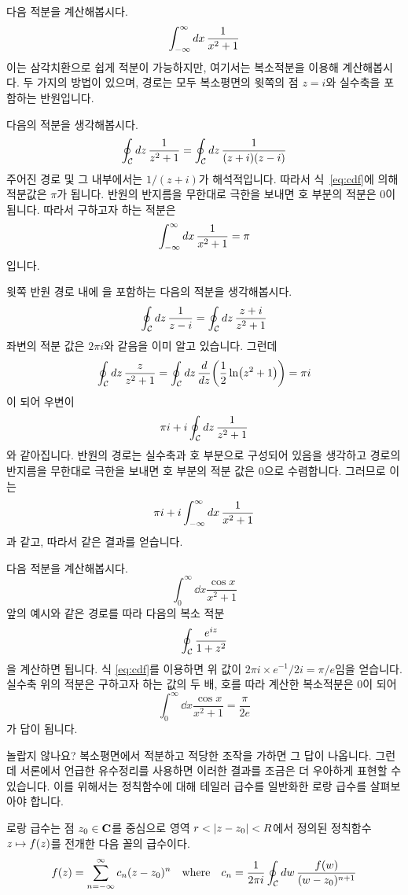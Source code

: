 \documentclass[11pt]{book}
\begin{document}
\begin{MLPar}
\example
다음 적분을 계산해봅시다.
\[\int_{-\infty}^{\infty}\dd{x}\frac{1}{x^2+1}\]
이는 삼각치환으로 쉽게 적분이 가능하지만, 여기서는 복소적분을 이용해 계산해봅시다.
두 가지의 방법이 있으며, 경로는 모두 복소평면의 윗쪽의 점 \(z=i\)와 실수축을 포함하는 반원입니다.

다음의 적분을 생각해봅시다.
\[\oint_{\mathcal{C}}\dd{z}\frac{1}{z^2+1}=\oint_{\mathcal{C}}\dd{z}\frac{1}{(z+i)(z-i)}\]
주어진 경로 및 그 내부에서는 \(1/(z+i)\)가 해석적입니다.
따라서 식~\ref{eq:cdf}에 의해 적분값은 \(\pi\)가 됩니다.
반원의 반지름을 무한대로 극한을 보내면 호 부분의 적분은 0이 됩니다.
따라서 구하고자 하는 적분은
\[\int_{-\infty}^{\infty}\dd{x}\frac{1}{x^2+1}=\pi\]
입니다.

윗쪽 반원 경로 내에 을 포함하는 다음의 적분을 생각해봅시다.
\[\oint_{\mathcal{C}}\dd{z}\frac{1}{z-i} = \oint_{\mathcal{C}}\dd{z}\frac{z+i}{z^2+1}\]
좌변의 적분 값은 \(2\pi i\)와 같음을 이미 알고 있습니다.
그런데
\[\cint\dd{z}\frac{z}{z^2+1} = \cint\dd{z}\dv{z}\pqty{\frac{1}{2}\ln(z^2+1)}=\pi i\]
이 되어 우변이 
\[\pi i + i\oint_{\mathcal{C}}\dd{z}\frac{1}{z^2+1}\]
와 같아집니다.%
반원의 경로는 실수축과 호 부분으로 구성되어 있음을 생각하고 경로의 반지름을 무한대로 극한을 보내면 호 부분의 적분 값은 \(0\)으로 수렴합니다.
그러므로 이는
\[\pi i + i\int_{-\infty}^{\infty}\dd{x}\frac{1}{x^2+1}\]
과 같고, 따라서 같은 결과를 얻습니다.

\example
다음 적분을 계산해봅시다.
\[\int_0^{\infty}\dd{x}\frac{\cos x}{x^2+1}\]
앞의 예시와 같은 경로를 따라 다음의 복소 적분
\[\oint_{\mathcal{C}}\frac{e^{iz}}{1+z^2}\]
을 계산하면 됩니다.
식 \ref{eq:cdf}를 이용하면 위 값이 \(2\pi i \times e^{-1}/2i = \pi/e\)임을 얻습니다.
실수축 위의 적분은 구하고자 하는 값의 두 배, 호를 따라 계산한 복소적분은 0이 되어
\[\int_0^{\infty}\dd{x}\frac{\cos x}{x^2+1} = \frac{\pi}{2e}\]
가 답이 됩니다.

놀랍지 않나요?
복소평면에서 적분하고 적당한 조작을 가하면 그 답이 나옵니다.
그런데 서론에서 언급한 유수정리를 사용하면 이러한 결과를 조금은 더 우아하게 표현할 수 있습니다.
이를 위해서는 정칙함수에 대해 테일러 급수를 일반화한 로랑 급수를 살펴보아야 합니다.
\end{MLPar}

\begin{MLDef}
로랑 급수는 점 \(z_0\in\mbox{$\mathbf C$}\)를 중심으로 영역 \(r < \abs{z-z_0} < R\)에서 정의된 정칙함수 \(z \mapsto f(z)\)를 전개한 다음 꼴의 급수이다.
\[f(z)=\sum_{n=-\infty}^{\infty}c_n(z-z_0)^n \quad\text{where}\quad c_n = \frac{1}{2\pi i}\oint_{\mathcal{C}}\dd{w}\frac{f(w)}{(w-z_0)^{n+1}}\]
\end{MLDef}
\end{document}
